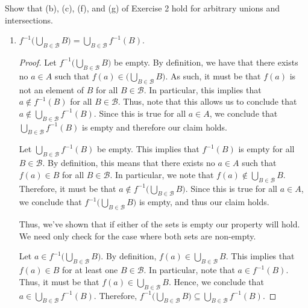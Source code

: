 \documentclass[12pt]{article}
\begin{document}
 Show that (b), (c), (f), and (g) of Exercise 2 hold for arbitrary unions 
and intersections.
\begin{enumerate}
	\item[(b)] $f^{-1} \big(\bigcup_{B \in \mathcal{B}} B\big) = 
	\bigcup_{B \in \mathcal{B}} f^{-1}(B)$.
	\begin{proof}
		Let $f^{-1}\big(\bigcup_{B \in \mathcal{B}} B\big)$ be empty. By definition,
		we have that there exists no $a \in A$ such that 
		$f(a) \in \big(\bigcup_{B \in \mathcal{B}} B\big)$. As such, it must be 
		that $f(a)$ is not an element of $B$ for all $B \in \mathcal{B}$. In particular,
		this implies that $a \notin f^{-1}(B)$ for all $B \in \mathcal{B}$. Thus, note
		that this allows us to conclude that $a \notin \bigcup_{B \in \mathcal{B}} f^{-1}(B)$.
		Since this is true for all $a \in A$, we conclude that 
		$\bigcup_{B \in \mathcal{B}} f^{-1}(B)$ is empty and therefore our claim holds.
		
		Let $\bigcup_{B \in \mathcal{B}} f^{-1}(B)$ be empty. This implies that 
		$f^{-1}(B)$ is empty for all $B \in \mathcal{B}$. By definition, this means 
		that there exists no $a \in A$ such that $f(a) \in B$ for all $B \in \mathcal{B}$.
		In particular, we note that $f(a) \notin \bigcup_{B \in \mathcal{B}} B$.
		Therefore, it must be that $a \notin f^{-1}\big(\bigcup_{B \in \mathcal{B}} B\big)$.
		Since this is true for all $a \in A$, we conclude that 
		$f^{-1}\big(\bigcup_{B \in \mathcal{B}} B\big)$ is empty, and thus our claim holds.
		
		Thus, we've shown that if either of the sets is empty our property will hold. We
		need only check for the case where both sets are non-empty.
		
		Let $a \in f^{-1}\big(\bigcup_{B \in \mathcal{B}} B\big)$. By definition,
		$f(a) \in \bigcup_{B \in \mathcal{B}} B$. This implies that 
		${f(a) \in B}$ for at least one $B \in \mathcal{B}$. In particular, note that
		$a \in f^{-1}(B)$. Thus, it must be that ${f(a) \in \bigcup_{B \in \mathcal{B}} B}$.
		Hence, we conclude that $a \in \bigcup_{B \in \mathcal{B}} f^{-1}(B)$.
		Therefore, $f^{-1}\big(\bigcup_{B \in \mathcal{B}} B\big) \subseteq 
		\bigcup_{B \in \mathcal{B}} f^{-1}(B)$.
		

\end{proof}
\end{enumerate}
\end{document}
